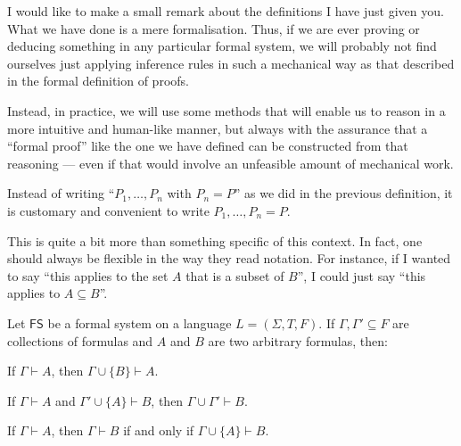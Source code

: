 \begin{para}
I would like to make a small remark about the definitions I have just given you.
What we have done is a mere formalisation.
Thus, if we are ever proving or deducing something in any particular formal system, we will probably not find ourselves just applying inference rules in such a mechanical way as that described in the formal definition of proofs.

Instead, in practice, we will use some methods that will enable us to reason in a more intuitive and human-like manner, but always with the assurance that a ``formal proof'' like the one we have defined can be constructed from that reasoning --- even if that would involve an unfeasible amount of mechanical work.
\end{para}

\begin{para}[Notation]
Instead of writing ``$P_1,\ldots,P_n$ with $P_n = P$'' as we did in the previous definition, it is customary and convenient to write $P_1,\ldots,P_n = P$.

This is quite a bit more than something specific of this context. In fact, one should always be flexible in the way they read notation. For instance, if I wanted to say ``this applies to the set $A$ that is a subset of $B$'', I could just say ``this applies to $A\subseteq B$''.
\end{para}

\begin{proposition}
Let $\mathsf{FS}$ be a formal system on a language $L = (\Sigma, T, F)$. If $\Gamma,\Gamma'\subseteq F$ are collections of formulas and $A$ and $B$ are two arbitrary formulas, then:
\begin{statements}
\item If $\Gamma \vdash A$, then $\Gamma \cup \{B\} \vdash A$.
\item If $\Gamma \vdash A$ and $\Gamma' \cup \{A\} \vdash B$, then $\Gamma \cup \Gamma' \vdash B$.
\item If $\Gamma \vdash A$, then $\Gamma \vdash B$ if and only if $\Gamma \cup \{A\} \vdash B$.
\end{statements}
\label{<+label+>}
\end{proposition}


